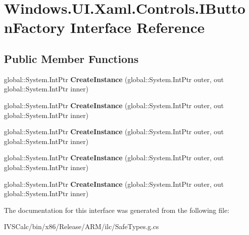 \hypertarget{interface_windows_1_1_u_i_1_1_xaml_1_1_controls_1_1_i_button_factory}{}\section{Windows.\+U\+I.\+Xaml.\+Controls.\+I\+Button\+Factory Interface Reference}
\label{interface_windows_1_1_u_i_1_1_xaml_1_1_controls_1_1_i_button_factory}
\subsection*{Public Member Functions}
\begin{DoxyCompactItemize}
\item 
\mbox{\label{interface_windows_1_1_u_i_1_1_xaml_1_1_controls_1_1_i_button_factory_a7e4b43611edbfdafe807e2c4b88f99e9}} 
global\+::\+System.\+Int\+Ptr {\bfseries Create\+Instance} (global\+::\+System.\+Int\+Ptr outer, out global\+::\+System.\+Int\+Ptr inner)
\item 
\mbox{\label{interface_windows_1_1_u_i_1_1_xaml_1_1_controls_1_1_i_button_factory_a7e4b43611edbfdafe807e2c4b88f99e9}} 
global\+::\+System.\+Int\+Ptr {\bfseries Create\+Instance} (global\+::\+System.\+Int\+Ptr outer, out global\+::\+System.\+Int\+Ptr inner)
\item 
\mbox{\label{interface_windows_1_1_u_i_1_1_xaml_1_1_controls_1_1_i_button_factory_a7e4b43611edbfdafe807e2c4b88f99e9}} 
global\+::\+System.\+Int\+Ptr {\bfseries Create\+Instance} (global\+::\+System.\+Int\+Ptr outer, out global\+::\+System.\+Int\+Ptr inner)
\item 
\mbox{\label{interface_windows_1_1_u_i_1_1_xaml_1_1_controls_1_1_i_button_factory_a7e4b43611edbfdafe807e2c4b88f99e9}} 
global\+::\+System.\+Int\+Ptr {\bfseries Create\+Instance} (global\+::\+System.\+Int\+Ptr outer, out global\+::\+System.\+Int\+Ptr inner)
\item 
\mbox{\label{interface_windows_1_1_u_i_1_1_xaml_1_1_controls_1_1_i_button_factory_a7e4b43611edbfdafe807e2c4b88f99e9}} 
global\+::\+System.\+Int\+Ptr {\bfseries Create\+Instance} (global\+::\+System.\+Int\+Ptr outer, out global\+::\+System.\+Int\+Ptr inner)
\end{DoxyCompactItemize}


The documentation for this interface was generated from the following file\+:\begin{DoxyCompactItemize}
\item 
I\+V\+S\+Calc/bin/x86/\+Release/\+A\+R\+M/ilc/Safe\+Types.\+g.\+cs\end{DoxyCompactItemize}
